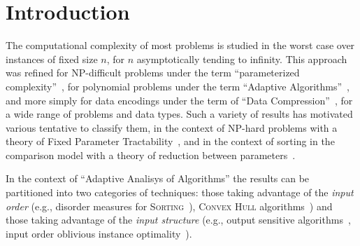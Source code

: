 \section{Introduction}
\label{sec:intro}

The computational complexity of most problems is studied in the worst
case over instances of fixed size $n$, for $n$ asymptotically tending
to infinity. This approach was refined for NP-difficult problems under
the term ``parameterized
complexity''~\cite{2006-BOOK-ParameterizedComplexityTheory-FlumGrohe},
for polynomial problems under the term ``Adaptive
Algorithms''~\cite{1992-ACMCS-ASurveyOfAdaptiveSortingAlgorithms-EstivillCastroWood,1992-ACJ-AnOverviewOfAdaptiveSorting-MoffatPetersson},
and more simply for data encodings under the term of ``Data
Compression''~\cite{2013-TCS-OnCompressingPermutationsAndAdaptiveSorting-BarbayNavarro},
for a wide range of problems and data types.
%
%
Such a variety of results has motivated various tentative to classify
them, in the context of NP-hard problems with a theory of Fixed
Parameter
Tractability~\cite{2006-BOOK-ParameterizedComplexityTheory-FlumGrohe},
and in the context of sorting in the comparison model with a theory of
reduction between
parameters~\cite{1995-DAM-AFrameworkForAdaptiveSorting-PeterssonMoffat}.
%

In the context of ``Adaptive Analisys of Algorithms'' the results can
be partitioned into two categories of techniques: those taking
advantage of the \emph{input order} (e.g., disorder measures for
\textsc{Sorting}~\cite{1992-ACJ-AnOverviewOfAdaptiveSorting-MoffatPetersson,1992-ACMCS-ASurveyOfAdaptiveSortingAlgorithms-EstivillCastroWood}),
\textsc{Convex Hull}
algorithms~\cite{2002-SWAT-AdaptiveAlgorithmsForConstructingConvexHullsAndTriangulationsOfPolygonalChains-LevcopoulosLingasMitchell})
and those taking advantage of the \emph{input structure} (e.g., output
sensitive
algorithms~\cite{1986-JCom-TheUltimatePlanarConvexHullAlgorithm-KirkpatrickSeidel},
input order oblivious instance
optimality~\cite{2009-FOCS-InstanceOptimalGeometricAlgorithms-AfshaniBarbayChan}).




